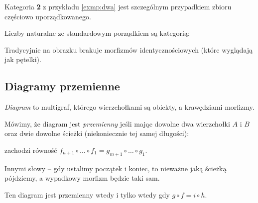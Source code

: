 \begin{exmp}
    Kategoria \textbf{2} z przykładu \ref{exmp:dwa} jest szczególnym przypadkiem zbioru częściowo uporządkowanego.
\end{exmp}

\begin{exmp}
  \label{exmp:natur}
  {\newcommand{\naturalnum}{\mathbb N}
  Liczby naturalne ze standardowym porządkiem są kategorią:
  \begin{center}
  \end{center}
  Tradycyjnie na obrazku brakuje morfizmów identycznościowych (które wyglądają jak pętelki).
  }
\end{exmp}

\subsection{Diagramy przemienne}
\begin{defn}
  \emph{Diagram} to multigraf, którego wierzchołkami są obiekty, a krawędziami morfizmy.

  Mówimy, że diagram jest \emph{przemienny} jeśli mając dowolne dwa wierzchołki $A$ i $B$ oraz dwie dowolne ścieżki (niekoniecznie tej samej długości):

  \begin{center}
  \end{center}
  zachodzi równość $f_{n+1}\circ \dots \circ f_1 = g_{m+1}\circ \dots \circ g_1$.

  Innymi słowy -- gdy ustalimy początek i koniec, to nieważne jaką ścieżką pójdziemy, a wypadkowy morfizm będzie taki sam.
\end{defn}

\begin{exmp}
  Ten diagram jest przemienny wtedy i tylko wtedy gdy $g\circ f = i\circ h$.
  \begin{center}
  \end{center}
\end{exmp}

